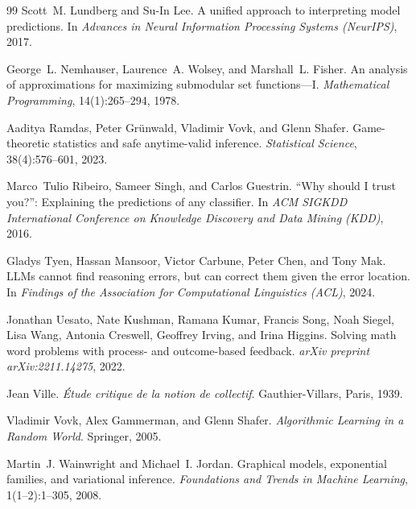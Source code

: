 \documentclass[11pt,a4paper]{article}
\theoremstyle{plain}
\theoremstyle{definition}
\theoremstyle{remark}
\begin{document}
\begin{thebibliography}{99}
Scott~M. Lundberg and Su-In Lee.
\newblock A unified approach to interpreting model predictions.
\newblock In \emph{Advances in Neural Information Processing Systems
  (NeurIPS)}, 2017.

George~L. Nemhauser, Laurence~A. Wolsey, and Marshall~L. Fisher.
\newblock An analysis of approximations for maximizing submodular
  set functions---I.
\newblock \emph{Mathematical Programming}, 14(1):265--294, 1978.

Aaditya Ramdas, Peter Gr{\"u}nwald, Vladimir Vovk, and Glenn
  Shafer.
\newblock Game-theoretic statistics and safe anytime-valid
  inference.
\newblock \emph{Statistical Science}, 38(4):576--601, 2023.

Marco~Tulio Ribeiro, Sameer Singh, and Carlos Guestrin.
\newblock ``Why should I trust you?'': Explaining the predictions of
  any classifier.
\newblock In \emph{ACM SIGKDD International Conference on Knowledge
  Discovery and Data Mining (KDD)}, 2016.

Gladys Tyen, Hassan Mansoor, Victor Carbune, Peter Chen, and Tony
  Mak.
\newblock LLMs cannot find reasoning errors, but can correct them
  given the error location.
\newblock In \emph{Findings of the Association for Computational
  Linguistics (ACL)}, 2024.

Jonathan Uesato, Nate Kushman, Ramana Kumar, Francis Song, Noah
  Siegel, Lisa Wang, Antonia Creswell, Geoffrey Irving, and Irina
  Higgins.
\newblock Solving math word problems with process- and
  outcome-based feedback.
\newblock \emph{arXiv preprint arXiv:2211.14275}, 2022.

Jean Ville.
\newblock \emph{\'Etude critique de la notion de collectif}.
\newblock Gauthier-Villars, Paris, 1939.

Vladimir Vovk, Alex Gammerman, and Glenn Shafer.
\newblock \emph{Algorithmic Learning in a Random World}.
\newblock Springer, 2005.

Martin~J. Wainwright and Michael~I. Jordan.
\newblock Graphical models, exponential families, and variational
  inference.
\newblock \emph{Foundations and Trends in Machine Learning},
  1(1--2):1--305, 2008.


\end{thebibliography}
\end{document}
